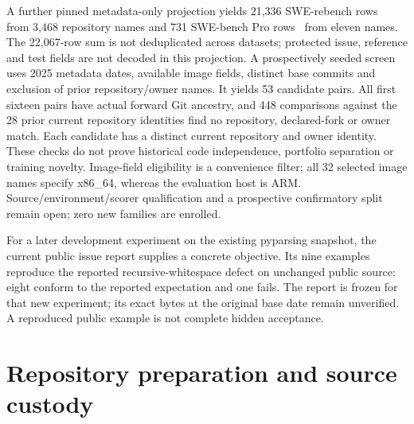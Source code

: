 A further pinned metadata-only projection yields 21,336 SWE-rebench
rows~\citep{swerebenchmetadata2026} from 3,468 repository names and 731
SWE-bench Pro rows~\citep{swebenchprometadata2026} from eleven names.
The 22,067-row sum is not deduplicated across datasets; protected issue,
reference and test fields are not decoded in this projection. A prospectively
seeded screen uses 2025 metadata dates, available image fields, distinct base
commits and exclusion of prior repository/owner names. It yields 53 candidate
pairs. All first sixteen pairs have actual forward Git ancestry, and 448
comparisons against the 28 prior current repository identities find no
repository, declared-fork or owner match. Each candidate has a distinct current
repository and owner identity. These checks do not prove historical code
independence, portfolio separation or training novelty. Image-field eligibility
is a convenience filter; all 32 selected image names specify x86\_64, whereas
the evaluation host is ARM. Source/environment/scorer qualification and a
prospective confirmatory split remain open; zero new families are enrolled.

For a later development experiment on the existing pyparsing snapshot, the
current public issue report supplies a concrete objective. Its nine examples
reproduce the reported recursive-whitespace defect on unchanged public source:
eight conform to the reported expectation and one fails. The report is frozen
for that new experiment; its exact bytes at the original base date remain
unverified. A reproduced public example is not complete hidden acceptance.

\section{Repository preparation and source custody}
\label{sec:incremental-context-preparation}
